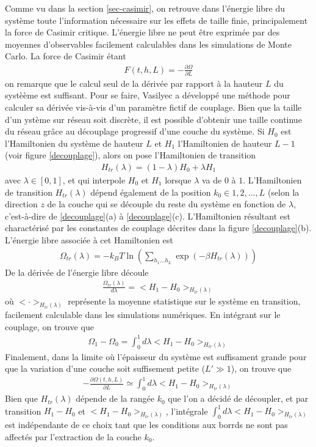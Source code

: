 Comme vu dans la section \ref{sec-casimir}, on retrouve dans l'énergie libre du système toute l'information nécessaire sur les effets de taille finie, principalement la force de Casimir critique. L'énergie libre ne peut être exprimée par des moyennes d'observables facilement calculables dans les simulations de Monte Carlo. La force de Casimir étant 
\begin{align}
    F(t,h,L) = - \frac{\partial \Omega}{\partial L}
\end{align}
on remarque que le calcul seul de la dérivée par rapport à la hauteur $L$ du systèème est suffisant. Pour se faire, Vasilyec \cite{vasilyev_monte_2007} a développé une méthode pour calculer sa dérivée vis-à-vis d'un paramètre fictif de couplage. Bien que la taille d'un ystème sur réseau soit discrète, il est possible d'obtenir une taille continue du réseau grâce au découplage progressif d'une couche du système. 
Si $H_0$ est l'Hamiltonien du système de hauteur $L$ et $H_1$ l'Hamiltonien de hauteur $L-1$ (voir figure \ref{decouplage}), alors on pose l'Hamiltonien de transition
\begin{align}
    H_{tr}(\lambda) = (1-\lambda) H_0 + \lambda H_1
    \label{hamil-trans}
\end{align}
avec $\lambda \in [0,1]$, et qui interpole $H_0$ et $H_1$ lorsque $\lambda$ va de $0$ à $1$. 
L'Hamiltonien de transition $H_{tr}(\lambda)$ dépend également de la position $k_0 \in {1,2,...,L}$ (selon la direction $z$ de la couche qui se découple du reste du système en fonction de $\lambda$, c'est-à-dire de \ref{decouplage}(a) à \ref{decouplage}(c). L'Hamiltonien résultant est charactérisé par les constantes de couplage décrites dans la figure \ref{decouplage}(b). L'énergie libre associée à cet Hamiltonien est
\begin{align}
    \Omega_{tr}(\lambda) = -k_B T \ln \left( \sum_{h_1 ... h_L} \exp(-\beta H_{tr}(\lambda)) \right)
\end{align}
De la dérivée de l'énergie libre découle
\begin{align}
    \frac{\Omega_{tr}(\lambda)}{d\lambda} = < H_1 - H_0>_{H_{tr}(\lambda)}
\end{align}
où $< \cdot >_{H_{tr}(\lambda)}$ représente la moyenne statistique sur le système en transition, facilement calculable dans les simulations numériques. En intégrant sur le couplage, on trouve que
\begin{align}
    \Omega_1 - \Omega_0 = \int_0^1 d\lambda  < H_1 - H_0>_{H_{tr}(\lambda)}
\end{align}
Finalement, dans la limite où l'épaisseur du système est suffisament grande pour que la variation d'une couche soit suffisement petite ($L' \gg 1$), on trouve que
\begin{align}
   - \frac{\partial \Omega(t,h,L)}{\partial L} \simeq  \int_0^1 d\lambda  < H_1 - H_0>_{H_{tr}(\lambda)}
\end{align}
Bien que $H_{tr}(\lambda)$ dépende de la rangée $k_0$ que l'on a décidé de découpler, et par transition $H_1-H_0$ et $< H_1 - H_0>_{H_{tr}(\lambda)}$, l'intégrale $\int_0^1 d\lambda < H_1 - H_0>_{H_{tr}(\lambda)}$ est indépendante de ce choix tant que les conditions aux borrds ne sont pas affectés par l'extraction de la couche $k_0$. 	


